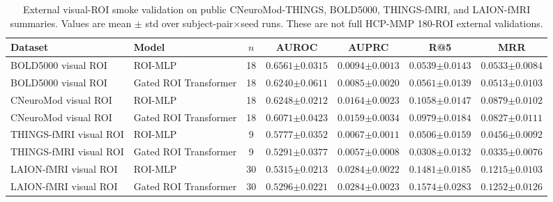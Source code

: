 \documentclass{article}
\begin{document}
\begin{table}[!htbp]
  \centering
  \caption{External visual-ROI smoke validation on public CNeuroMod-THINGS, BOLD5000, THINGS-fMRI, and LAION-fMRI summaries. Values are mean $\pm$ std over subject-pair$\times$seed runs. These are not full HCP-MMP 180-ROI external validations.}
  \label{tab:external_visual_roi_smoke}
  \scriptsize
  \setlength{\tabcolsep}{3.2pt}
  \renewcommand{\arraystretch}{1.15}
  \begin{tabular}{llccccc}
    \toprule
    Dataset & Model & $n$ & AUROC & AUPRC & R@5 & MRR \\
    \midrule
    BOLD5000 visual ROI & ROI-MLP & 18 & $\mathbf{0.6561{\scriptstyle\pm0.0315}}$ & $\mathbf{0.0094{\scriptstyle\pm0.0013}}$ & $0.0539{\scriptstyle\pm0.0143}$ & $\mathbf{0.0533{\scriptstyle\pm0.0084}}$ \\
    BOLD5000 visual ROI & Gated ROI Transformer & 18 & $0.6240{\scriptstyle\pm0.0611}$ & $0.0085{\scriptstyle\pm0.0020}$ & $\mathbf{0.0561{\scriptstyle\pm0.0139}}$ & $0.0513{\scriptstyle\pm0.0103}$ \\
    CNeuroMod visual ROI & ROI-MLP & 18 & $\mathbf{0.6248{\scriptstyle\pm0.0212}}$ & $\mathbf{0.0164{\scriptstyle\pm0.0023}}$ & $\mathbf{0.1058{\scriptstyle\pm0.0147}}$ & $\mathbf{0.0879{\scriptstyle\pm0.0102}}$ \\
    CNeuroMod visual ROI & Gated ROI Transformer & 18 & $0.6071{\scriptstyle\pm0.0423}$ & $0.0159{\scriptstyle\pm0.0034}$ & $0.0979{\scriptstyle\pm0.0184}$ & $0.0827{\scriptstyle\pm0.0111}$ \\
    THINGS-fMRI visual ROI & ROI-MLP & 9 & $\mathbf{0.5777{\scriptstyle\pm0.0352}}$ & $\mathbf{0.0067{\scriptstyle\pm0.0011}}$ & $\mathbf{0.0506{\scriptstyle\pm0.0159}}$ & $\mathbf{0.0456{\scriptstyle\pm0.0092}}$ \\
    THINGS-fMRI visual ROI & Gated ROI Transformer & 9 & $0.5291{\scriptstyle\pm0.0377}$ & $0.0057{\scriptstyle\pm0.0008}$ & $0.0308{\scriptstyle\pm0.0132}$ & $0.0335{\scriptstyle\pm0.0076}$ \\
    LAION-fMRI visual ROI & ROI-MLP & 30 & $\mathbf{0.5315{\scriptstyle\pm0.0213}}$ & $0.0284{\scriptstyle\pm0.0022}$ & $0.1481{\scriptstyle\pm0.0185}$ & $0.1215{\scriptstyle\pm0.0103}$ \\
    LAION-fMRI visual ROI & Gated ROI Transformer & 30 & $0.5296{\scriptstyle\pm0.0221}$ & $\mathbf{0.0284{\scriptstyle\pm0.0023}}$ & $\mathbf{0.1574{\scriptstyle\pm0.0283}}$ & $\mathbf{0.1252{\scriptstyle\pm0.0126}}$ \\
    \bottomrule
  \end{tabular}
\end{table}
\end{document}
